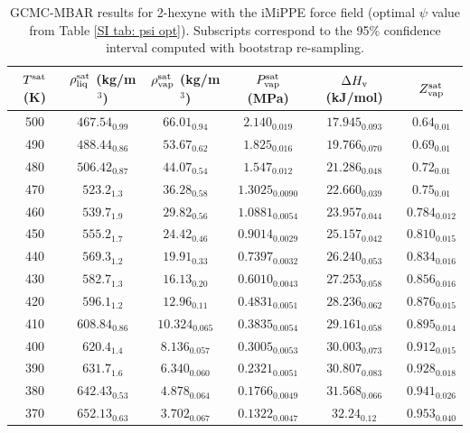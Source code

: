 \documentclass[journal=jctc,manuscript=article]{achemso}
\begin{document}
\begin{table}[htb!]
	\caption{GCMC-MBAR results for 2-hexyne with the iMiPPE force field (optimal $\psi$ value from Table \ref{SI tab: psi opt}). Subscripts correspond to the 95\% confidence interval computed with bootstrap re-sampling.}
	\begin{center}
		\begin{tabular}{|c|c|c|c|c|c|}
			\hline
			$T^{\rm sat}$ (K) & $\rho_{\rm liq}^{\rm sat}$ (kg/m$^3$) & $\rho_{\rm vap}^{\rm sat}$ (kg/m$^3$) & $P_{\rm vap}^{\rm sat}$ (MPa) & $\Delta H_{\rm v}$ (kJ/mol) & $Z_{\rm vap}^{\rm sat}$ \\ \hline
			500 & $467.54_{0.99}$ & $66.01_{0.94}$ & $2.140_{0.019}$ & $17.945_{0.093}$ & $0.64_{0.01}$ \\
			490 & $488.44_{0.86}$ & $53.67_{0.62}$ & $1.825_{0.016}$ & $19.766_{0.070}$ & $0.69_{0.01}$ \\
			480 & $506.42_{0.87}$ & $44.07_{0.54}$ & $1.547_{0.012}$ & $21.286_{0.048}$ & $0.72_{0.01}$ \\
			470 & $523.2_{1.3}$ & $36.28_{0.58}$ & $1.3025_{0.0090}$ & $22.660_{0.039}$ & $0.75_{0.01}$ \\
			460 & $539.7_{1.9}$ & $29.82_{0.56}$ & $1.0881_{0.0054}$ & $23.957_{0.044}$ & $0.784_{0.012}$ \\
			450 & $555.2_{1.7}$ & $24.42_{0.46}$ & $0.9014_{0.0029}$ & $25.157_{0.042}$ & $0.810_{0.015}$ \\
			440 & $569.3_{1.2}$ & $19.91_{0.33}$ & $0.7397_{0.0032}$ & $26.240_{0.053}$ & $0.834_{0.016}$ \\
			430 & $582.7_{1.3}$ & $16.13_{0.20}$ & $0.6010_{0.0043}$ & $27.253_{0.058}$ & $0.856_{0.016}$ \\
			420 & $596.1_{1.2}$ & $12.96_{0.11}$ & $0.4831_{0.0051}$ & $28.236_{0.062}$ & $0.876_{0.015}$ \\
			410 & $608.84_{0.86}$ & $10.324_{0.065}$ & $0.3835_{0.0054}$ & $29.161_{0.058}$ & $0.895_{0.014}$ \\
			400 & $620.4_{1.4}$ & $8.136_{0.057}$ & $0.3005_{0.0053}$ & $30.003_{0.073}$ & $0.912_{0.015}$ \\
			390 & $631.7_{1.6}$ & $6.340_{0.060}$ & $0.2321_{0.0051}$ & $30.807_{0.083}$ & $0.928_{0.018}$ \\
			380 & $642.43_{0.53}$ & $4.878_{0.064}$ & $0.1766_{0.0049}$ & $31.568_{0.066}$ & $0.941_{0.026}$ \\
			370 & $652.13_{0.63}$ & $3.702_{0.067}$ & $0.1322_{0.0047}$ & $32.24_{0.12}$ & $0.953_{0.040}$ \\
			\hline
		\end{tabular}
	\end{center}
\end{table}
\end{document}
